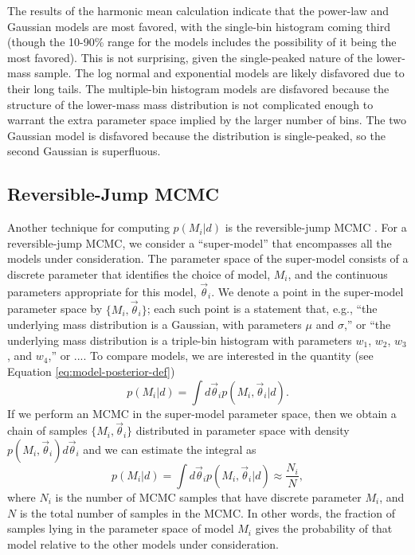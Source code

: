\documentclass[preprint]{aastex}
\newcommand{\vtheta}{\vec{\theta}}
\begin{document}
The results of the harmonic mean calculation indicate that the
power-law and Gaussian models are most favored, with the single-bin
histogram coming third (though the 10-90\% range for the models
includes the possibility of it being the most favored).  This is not
surprising, given the single-peaked nature of the lower-mass sample.
The log normal and exponential models are likely disfavored due to
their long tails.  The multiple-bin histogram models are disfavored
because the structure of the lower-mass mass distribution is not
complicated enough to warrant the extra parameter space implied by the
larger number of bins.  The two Gaussian model is disfavored because
the distribution is single-peaked, so the second Gaussian is
superfluous.  

\subsection{Reversible-Jump MCMC}
\label{sec:reversible-jump-mcmc}

Another technique for computing $p(M_i|d)$ is the reversible-jump MCMC
\citep{Green1995}.  For a reversible-jump MCMC, we consider a
``super-model'' that encompasses all the models under consideration.
The parameter space of the super-model consists of a discrete
parameter that identifies the choice of model, $M_i$, and the
continuous parameters appropriate for this model, $\vtheta_i$.  We
denote a point in the super-model parameter space by $\{M_i,
\vtheta_i\}$; each such point is a statement that, e.g., ``the
underlying mass distribution is a Gaussian, with parameters $\mu$ and
$\sigma$,'' or ``the underlying mass distribution is a triple-bin
histogram with parameters $w_1$, $w_2$, $w_3$, and $w_4$,'' or ....
To compare models, we are interested in the quantity (see Equation
\eqref{eq:model-posterior-def})
\begin{equation}
  p(M_i|d) = \int d\vtheta_i p(M_i, \vtheta_i|d).
\end{equation}
If we perform an MCMC in the super-model parameter space, then we
obtain a chain of samples $\{M_i, \vtheta_i\}$ distributed in
parameter space with density $p(M_i,\vtheta_i) d\vtheta_i$ and we can
estimate the integral as
\begin{equation}
  p(M_i|d) = \int d\vtheta_i p(M_i, \vtheta_i|d) \approx \frac{N_i}{N},
\end{equation}
where $N_i$ is the number of MCMC samples that have discrete parameter
$M_i$, and $N$ is the total number of samples in the MCMC.  In other
words, the fraction of samples lying in the parameter space of model
$M_i$ gives the probability of that model relative to the other models
under consideration.
\end{document}
